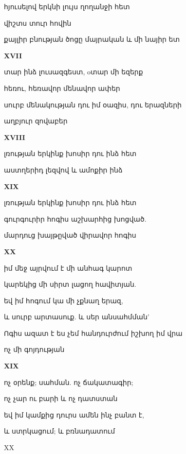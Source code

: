 հյուսելով երկնի լույս ղողանջի հետ



վիշտս տուր հովին 



քայլիր բնության ծոցը մայրական   և մի նայիր ետ



\centerline\bf {\bf   XVII}



տար ինձ  լուսազգեստ,   oտար մի եզերք

հեռու, հեռավոր  մենավոր   ափեր


սուրբ մենակության դու իմ օազիս,  դու երազների 



աղբյուր  զովաբեր


\centerline {\bf    XVIII}

լռության երկինք խոսիր դու ինձ հետ


աստղերիդ լեզվով և ամոքիր ինձ


\centerline{\bf  XIX}

լռության երկինք խոսիր դու ինձ հետ


գուրգուրիր  հոգիս աշխարհից խոցված.

մարդուց խայթըված վիրավոր  հոգիս

\centerline {\bf   XX  }



իմ մեջ այրվում է մի անհագ  կարոտ 

կարեկից մի սիրտ  լացող հավիտյան.




եվ իմ  հոգում  կա մի չքնաղ  երազ, 

և սուրբ արտասուք. և սեր անսահմման'

  Ոգիս  ազատ է ես  չեմ հանդուրժում իշխող իմ վրա



 ոչ  մի գոյդության




\centerline{\bf XIX}



ոչ օրենք;  սահման. ոչ ճակատագիր;



ոչ չար ու բարի և ոչ դատստան  


եվ  իմ կամքից դուրս ամեն ինչ բանտ է,



և ստրկացում;  և   բռնադատում






\centerline {XX}

